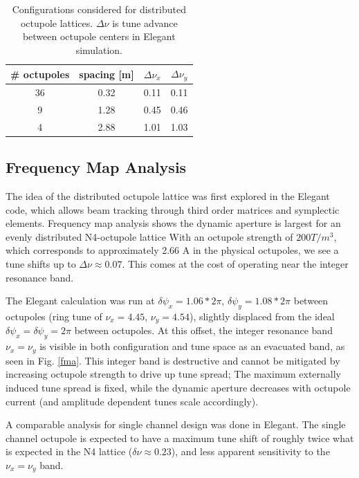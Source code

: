 \begin{table}
\centering
	\begin{tabular}{|c|c|c|c|}
	\hline
	\# octupoles & spacing [m] & $\Delta \nu_x$ & $\Delta \nu_y$ \\
	\hline
	36 & 0.32 & 0.11 & 0.11 \\
	9 & 1.28 & 0.45 & 0.46 \\
	4 & 2.88 & 1.01 & 1.03 \\
	\hline
	\end{tabular}
\caption{Configurations considered for distributed octupole lattices. $\Delta \nu$ is tune advance between octupole centers in Elegant simulation.}
\label{tab:Noctlattices}
\end{table}




\subsection{Frequency Map Analysis} 


The idea of the distributed octupole lattice was first explored in the Elegant code, which allows beam tracking through third order matrices and symplectic elements.\cite{elegant} Frequency map analysis shows the dynamic aperture is largest for an evenly distributed N4-octupole lattice With an octupole strength of $200 T/m^3$, which corresponds to approximately 2.66 A in the physical octupoles, we see a tune shifts up to $ \Delta \nu \approx 0.07$. This comes at the cost of operating near the integer resonance band. 

The Elegant calculation was run at $\delta \psi_x = 1.06 *2 \pi$, $\delta \psi_y = 1.08 *2 \pi$ between octupoles (ring tune of $\nu_x=4.45$, $\nu_y=4.54$), slightly displaced from the ideal $\delta \psi_x =  \delta \psi_y = 2 \pi$ between octupoles. At this offset, the integer resonance band $\nu_x=\nu_y$ is visible in both configuration and tune space as an evacuated band, as seen in Fig. \ref{fma}. This integer band is destructive and cannot be mitigated by increasing octupole strength to drive up tune spread; The maximum externally induced tune spread is fixed, while the dynamic aperture decreases with octupole current (and amplitude dependent tunes scale accordingly). 

A comparable analysis for single channel design was done in Elegant. The single channel octupole is expected to have a maximum tune shift of roughly twice what is expected in the N4 lattice ($\delta \nu \approx 0.23$), and less apparent sensitivity to the $\nu_x=\nu_y$ band.

